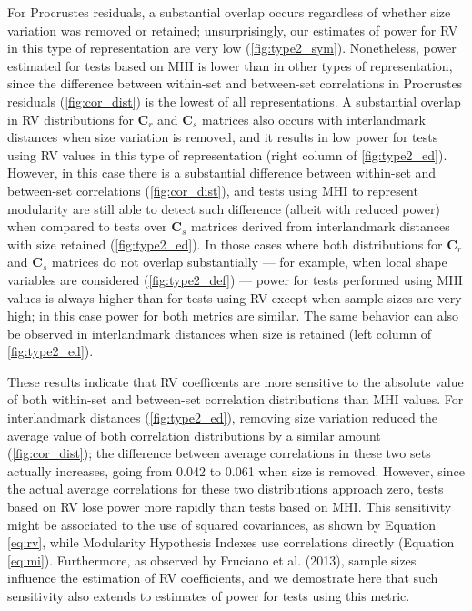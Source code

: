 \documentclass[12pt,twoside]{report}
\begin{document}
For Procrustes residuals, a substantial overlap occurs regardless of
whether size variation was removed or retained; unsurprisingly, our
estimates of power for RV in this type of representation are very low
(\autoref{fig:type2_sym}). Nonetheless, power estimated for tests based
on MHI is lower than in other types of representation, since the
difference between within-set and between-set correlations in Procrustes
residuals (\autoref{fig:cor_dist}) is the lowest of all representations.
A substantial overlap in RV distributions for $\mathbf{C}_r$ and
$\mathbf{C}_s$ matrices also occurs with interlandmark distances when
size variation is removed, and it results in low power for tests using
RV values in this type of representation (right column of
\autoref{fig:type2_ed}). However, in this case there is a substantial
difference between within-set and between-set correlations
(\autoref{fig:cor_dist}), and tests using MHI to represent modularity
are still able to detect such difference (albeit with reduced power)
when compared to tests over $\mathbf{C}_s$ matrices derived from
interlandmark distances with size retained (\autoref{fig:type2_ed}). In
those cases where both distributions for $\mathbf{C}_r$ and
$\mathbf{C}_s$ matrices do not overlap substantially --- for example,
when local shape variables are considered (\autoref{fig:type2_def}) ---
power for tests performed using MHI values is always higher than for
tests using RV except when sample sizes are very high; in this case
power for both metrics are similar. The same behavior can also be
observed in interlandmark distances when size is retained (left column
of \autoref{fig:type2_ed}).

These results indicate that RV coefficents are more sensitive to the
absolute value of both within-set and between-set correlation
distributions than MHI values. For interlandmark distances
(\autoref{fig:type2_ed}), removing size variation reduced the average
value of both correlation distributions by a similar amount
(\autoref{fig:cor_dist}); the difference between average correlations in
these two sets actually increases, going from 0.042 to 0.061 when size
is removed. However, since the actual average correlations for these two
distributions approach zero, tests based on RV lose power more rapidly
than tests based on MHI. This sensitivity might be associated to the use
of squared covariances, as shown by Equation \ref{eq:rv}, while
Modularity Hypothesis Indexes use correlations directly (Equation
\ref{eq:mi}). Furthermore, as observed by Fruciano et al. (2013), sample
sizes influence the estimation of RV coefficients, and we demostrate
here that such sensitivity also extends to estimates of power for tests
using this metric.
\end{document}
